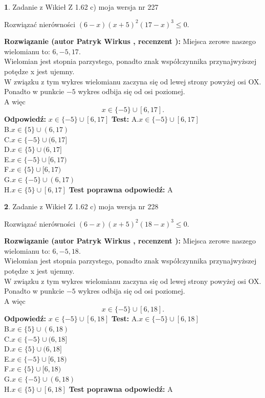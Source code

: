 \documentclass[12pt, a4paper]{article}
\theoremstyle{definition} %
\newtheorem{zad}{}
\newcommand{\zadStart}[1]{\begin{zad}#1\newline}
\newcommand{\zadStop}{\end{zad}}
\newcommand{\rozwStart}[2]{\noindent \textbf{Rozwiązanie (autor #1 , recenzent #2): }\newline}
\newcommand{\rozwStop}{\newline}
\newcommand{\odpStart}{\noindent \textbf{Odpowiedź:}\newline}
\newcommand{\odpStop}{\newline}
\newcommand{\testStart}{\noindent \textbf{Test:}\newline}
\newcommand{\testStop}{\newline}
\newcommand{\kluczStart}{\noindent \textbf{Test poprawna odpowiedź:}\newline}
\newcommand{\kluczStop}{\newline}
\begin{document}
\zadStart{Zadanie z Wikieł Z 1.62 c) moja wersja nr 227}

Rozwiązać nierówności $(6-x)(x+5)^{2}(17-x)^{3}\le0$.
\zadStop
\rozwStart{Patryk Wirkus}{}
Miejsca zerowe naszego wielomianu to: $6, -5, 17$.\\
Wielomian jest stopnia parzystego, ponadto znak współczynnika przy\linebreak najwyższej potędze x jest ujemny.\\ W związku z tym wykres wielomianu zaczyna się od lewej strony powyżej osi OX.\\
Ponadto w punkcie $-5$ wykres odbija się od osi poziomej.\\
A więc $$x \in \{-5\} \cup [6,17].$$
\rozwStop
\odpStart
$x \in \{-5\} \cup [6,17]$
\odpStop
\testStart
A.$x \in \{-5\} \cup [6,17]$\\
B.$x \in \{5\} \cup (6,17)$\\
C.$x \in \{-5\} \cup (6,17]$\\
D.$x \in \{5\} \cup (6,17]$\\
E.$x \in \{-5\} \cup [6,17)$\\
F.$x \in \{5\} \cup [6,17)$\\
G.$x \in \{-5\} \cup (6,17)$\\
H.$x \in \{5\} \cup [6,17]$
\testStop
\kluczStart
A
\kluczStop



\zadStart{Zadanie z Wikieł Z 1.62 c) moja wersja nr 228}

Rozwiązać nierówności $(6-x)(x+5)^{2}(18-x)^{3}\le0$.
\zadStop
\rozwStart{Patryk Wirkus}{}
Miejsca zerowe naszego wielomianu to: $6, -5, 18$.\\
Wielomian jest stopnia parzystego, ponadto znak współczynnika przy\linebreak najwyższej potędze x jest ujemny.\\ W związku z tym wykres wielomianu zaczyna się od lewej strony powyżej osi OX.\\
Ponadto w punkcie $-5$ wykres odbija się od osi poziomej.\\
A więc $$x \in \{-5\} \cup [6,18].$$
\rozwStop
\odpStart
$x \in \{-5\} \cup [6,18]$
\odpStop
\testStart
A.$x \in \{-5\} \cup [6,18]$\\
B.$x \in \{5\} \cup (6,18)$\\
C.$x \in \{-5\} \cup (6,18]$\\
D.$x \in \{5\} \cup (6,18]$\\
E.$x \in \{-5\} \cup [6,18)$\\
F.$x \in \{5\} \cup [6,18)$\\
G.$x \in \{-5\} \cup (6,18)$\\
H.$x \in \{5\} \cup [6,18]$
\testStop
\kluczStart
A
\kluczStop
\end{document}
